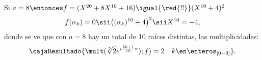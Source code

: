 \bigskip

Si $a = 8 \entonces f = (X^{20} + 8X^{10} + 16) \igual{\red{!!}} (X^{10} + 4)^2$
$$
	f(\alpha_k) = 0
	\sii
	\big((\alpha_k)^{10} + 4\big)^2
	\sii
	X^{10} = -4,
$$
donde se ve que con $a = 8$ hay un total de 10 raíces distintas, las multiplicidades:
$$
	\cajaResultado{\mult(\sqrt[5]{2}e^{i\frac{2k+1}{10}\pi});f) = 2 \quad k \en \enteros_{[0-9]}}.
$$

\begin{aportes}
	\item {}
\end{aportes}

